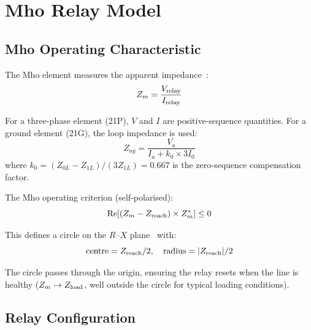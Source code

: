 \documentclass[11pt, a4paper]{article}
\begin{document}
\section{Mho Relay Model}
\label{sec:model}

\subsection{Mho Operating Characteristic}

The Mho element measures the apparent impedance~\cite{Anderson1999,Horowitz2008,Ziegler2006}:
\begin{equation}
  Z_m = \frac{V_{\rm relay}}{I_{\rm relay}}
\end{equation}

For a three-phase element (21P), $V$ and $I$ are positive-sequence quantities.
For a ground element (21G), the loop impedance is used:
\begin{equation}
  Z_{ag} = \frac{V_a}{I_a + k_0 \times 3 I_0}
\end{equation}
where $k_0 = (Z_{0L} - Z_{1L}) / (3 Z_{1L}) = 0.667$ is the zero-sequence
compensation factor.

The Mho operating criterion (self-polarised):
\begin{equation}
  \mathrm{Re}\!\left[\left(Z_m - Z_{\rm reach}\right) \times Z_m^*\right] \leq 0
  \label{eq:mho}
\end{equation}

This defines a circle on the $R$--$X$ plane~\cite{Blackburn2006,IEEE_C37_113} with:
\begin{equation}
  \text{centre} = Z_{\rm reach}/2, \quad
  \text{radius} = |Z_{\rm reach}|/2
\end{equation}

The circle passes through the origin, ensuring the relay resets when the
line is healthy ($Z_m \to Z_{\rm load}$, well outside the circle for
typical loading conditions).

\subsection{Relay Configuration}
\end{document}
